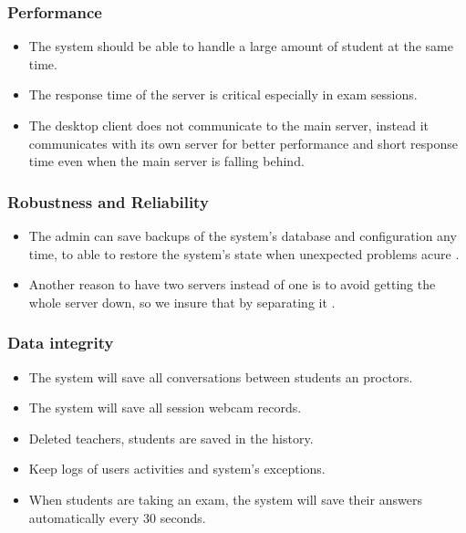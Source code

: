 \documentclass[]{uc2pfecaneva}
\begin{document}
    \raggedright\subsubsection{Performance}
    \begin{itemize}
        \item The system should be able to handle a large amount of student at the same time.
        \item The response time of the server is critical especially in exam sessions.
        \item The desktop client does not communicate to the main server, instead it communicates with its own server for better performance and short response time even when the main server is falling behind.
    \end{itemize}

    \raggedright\subsubsection{Robustness and Reliability}
    \begin{itemize}
        \item The admin can save backups of the system’s database and configuration any time, to able to restore the system’s state when  unexpected problems acure .
        \item Another reason to have two servers instead of one is to avoid getting the whole server down, so we insure that by separating it .
    \end{itemize}

    \raggedright\subsubsection{Data integrity}
    \begin{itemize}
        \item The system will save all conversations between students an proctors.
        \item The system will save all session webcam records.
        \item Deleted teachers, students are saved in the history.
        \item Keep logs of users activities and system’s exceptions.
        \item When students are taking an exam, the system will save their answers automatically every 30 seconds.
    \end{itemize}
\end{document}
